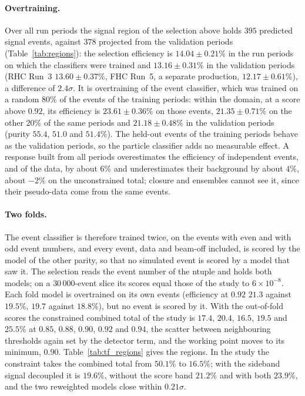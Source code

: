 \documentclass[11pt,a4paper]{article}
\begin{document}
\paragraph{Overtraining.} Over all run periods the signal region of the selection above holds $395$ predicted signal
events, against $378$ projected from the validation periods (Table~\ref{tab:regions}): the selection efficiency is
$14.04\pm0.21\%$ in the run periods on which the classifiers were trained and $13.16\pm0.31\%$ in the validation periods
(RHC Run~3 $13.60\pm0.37\%$, FHC Run~5, a separate production, $12.17\pm0.61\%$), a difference of $2.4\sigma$. It is
overtraining of the event classifier, which was trained on a random $80\%$ of the events of the training periods: within
the domain, at a score above $0.92$, its efficiency is $23.61\pm0.36\%$ on those events, $21.35\pm0.71\%$ on the other
$20\%$ of the same periods and $21.18\pm0.48\%$ in the validation periods (purity $55.4$, $51.0$ and $51.4\%$). The
held-out events of the training periods behave as the validation periods, so the particle classifier adds no measurable
effect. A response built from all periods overestimates the efficiency of independent events, and of the data, by about
$6\%$ and underestimates their background by about $4\%$, about $-2\%$ on the unconstrained total; closure and
ensembles cannot see it, since their pseudo-data come from the same events.

\paragraph{Two folds.} The event classifier is therefore trained twice, on the events with even and with odd event
numbers, and every event, data and beam-off included, is scored by the model of the other parity, so that no simulated
event is scored by a model that saw it. The selection reads the event number of the ntuple and holds both models; on a
$30\,000$-event slice its scores equal those of the study to $6\times10^{-8}$. Each fold model is overtrained on its own
events (efficiency at $0.92$ $21.3$ against $19.5\%$, $19.7$ against $18.8\%$), but no event is scored by it. With the
out-of-fold scores the constrained combined total of the study is $17.4$, $20.4$, $16.5$, $19.5$ and $25.5\%$ at $0.85$,
$0.88$, $0.90$, $0.92$ and $0.94$, the scatter between neighbouring thresholds again set by the detector term, and the
working point moves to its minimum, $0.90$. Table~\ref{tab:tf_regions} gives the regions. In the study the
constraint takes the combined total from $50.1\%$ to $16.5\%$; with the sideband signal decoupled it is $19.6\%$, without
the score band $21.2\%$ and with both $23.9\%$, and the two reweighted models close within $0.21\sigma$.
\end{document}
